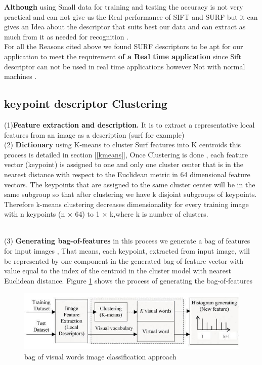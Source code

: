\textbf{Although} using Small data for training and testing the accuracy is not very practical and can not give us the Real performance of SIFT and SURF but it can gives an Idea about the descriptor that suits best our data and can extract as much from it as needed for recognition .\\ For all the Reasons cited above  we found SURF descriptors to be apt for our application to meet the requirement  \textbf{of a  Real time application} since Sift descriptor can not be used in real time applications however Not with normal machines .


\subsection{keypoint descriptor Clustering }


(1)\textbf{Feature extraction and description.} It is to extract a representative local features from an image as a description (surf for example)  \\(2)\textbf{ Dictionary}
using K-means to cluster Surf features into K centroids this process is detailed in section [\ref{kmeans}],  Once Clustering is done , each feature vector (keypoint) is assigned to one and only one cluster center that is in the
nearest distance with respect to the Euclidean metric in 64
dimensional feature vectors. The keypoints that are assigned to
the same cluster center will be in the same subgroup so that
after clustering we have k disjoint subgroups of keypoints.
Therefore k-means clustering decreases dimensionality for
every training image with n keypoints (n $\times$ 64) to 1 $\times$ k,where k is number of clusters.

\\(3)\textbf{ Generating bag-of-features} in this process we generate a bag of features for input images  , That means, each keypoint, extracted from input  image, will be represented by one component in the generated
bag-of-feature vector with value equal to the index of the
centroid in the cluster model with nearest Euclidean
distance. Figure \ref{fig:bag} shows the process of generating the
bag-of-features

\begin{figure}[H]
\centering
\includegraphics[width=1.0\textwidth]{img/BAG.jpg}
\caption{ bag of visual words image classification approach   }
\label{fig:bag}
\end{figure}

